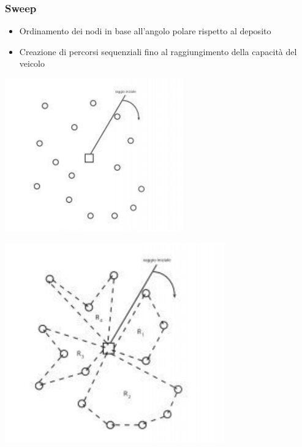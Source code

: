 \documentclass[compress]{beamer}
\begin{document}
\subsubsection{Sweep}
\begin{frame}{\subsubsecname}
    \begin{itemize}
        \item Ordinamento dei nodi in base all'angolo polare rispetto al deposito
        \item Creazione di percorsi sequenziali fino al raggiungimento della capacità del veicolo
    \end{itemize}
    \hfill
    \begin{minipage}{0.49\textwidth}
		\centering
		\includegraphics[width=0.8\linewidth]{images/sweep1.png}
	\end{minipage}
	\hfill
	\begin{minipage}{0.49\textwidth}
		\centering
		\includegraphics[width=0.8\linewidth]{images/sweep2.png}
	\end{minipage}
\end{frame}
\end{document}
